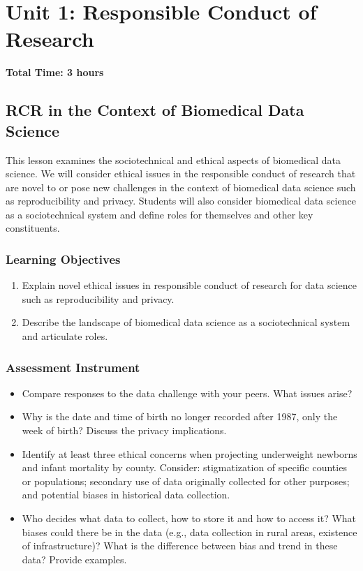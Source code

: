 \chapter{Unit 1: Responsible Conduct of Research}
\label{chap:unit1}

\textbf{Total Time: 3 hours}

\section{RCR in the Context of Biomedical Data Science}
\label{sec:1.1}

This lesson examines the sociotechnical and ethical aspects of biomedical data science. We will consider ethical issues in the responsible conduct of research that are novel to or pose new challenges in the context of biomedical data science such as reproducibility and privacy. Students will also consider biomedical data science as a sociotechnical system and define roles for themselves and other key constituents.

\subsection{Learning Objectives}

\begin{enumerate}
    \item Explain novel ethical issues in responsible conduct of research for data science such as reproducibility and privacy.
    \item Describe the landscape of biomedical data science as a sociotechnical system and articulate roles.
\end{enumerate}

\subsection{Assessment Instrument}

\begin{itemize}
    \item Compare responses to the data challenge with your peers. What issues arise?
    \item Why is the date and time of birth no longer recorded after 1987, only the week of birth? Discuss the privacy implications.
    \item Identify at least three ethical concerns when projecting underweight newborns and infant mortality by county. Consider: stigmatization of specific counties or populations; secondary use of data originally collected for other purposes; and potential biases in historical data collection.
    \item Who decides what data to collect, how to store it and how to access it? What biases could there be in the data (e.g., data collection in rural areas, existence of infrastructure)? What is the difference between bias and trend in these data? Provide examples.
\end{itemize}

